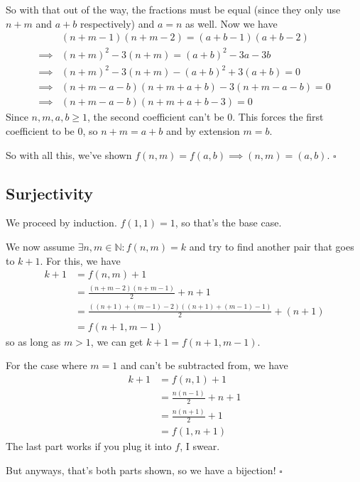 \documentclass[12pt]{article}
\newcommand{\N}{\mathbb{N}}
\begin{document}
So with that out of the way, the fractions must be equal
(since they only use $n+m$ and $a+b$ respectively) and $a=n$ as well.
Now we have
\begin{align*}
               & (n+m-1)(n+m-2)=(a+b-1)(a+b-2)   \\
  \implies{} & (n+m)^2-3(n+m)=(a+b)^2-3a-3b    \\
  \implies{} & (n+m)^2-3(n+m)-(a+b)^2+3(a+b)=0 \\
  \implies{} & (n+m-a-b)(n+m+a+b)-3(n+m-a-b)=0 \\
  \implies{} & (n+m-a-b)(n+m+a+b-3)=0
\end{align*}
Since $n, m, a, b \ge 1$, the second coefficient can't be $0$.
This forces the first coefficient to be $0$, so $n+m=a+b$ and by extension $m=b$.

So with all this, we've shown $f(n, m)=f(a, b) \implies (n, m)=(a, b)$. $\square$

\pagebreak

\subsection{Surjectivity}

We proceed by induction.
$f(1, 1)=1$, so that's the base case.

We now assume $\exists n, m \in \N: f(n, m)=k$
and try to find another pair that goes to $k+1$.
For this, we have
\begin{align*}
  k+1
   & = f(n, m)+1                                      \\
   & = \frac{(n+m-2)(n+m-1)}{2}+n+1                   \\
   & = \frac{((n+1)+(m-1)-2)((n+1)+(m-1)-1)}{2}+(n+1) \\
   & = f(n+1, m-1)
\end{align*}
so as long as $m > 1$, we can get $k+1=f(n+1, m-1)$.

For the case where $m=1$ and can't be subtracted from, we have
\begin{align*}
  k+1
   & = f(n, 1)+1            \\
   & = \frac{n(n-1)}{2}+n+1 \\
   & = \frac{n(n+1)}{2}+1   \\
   & = f(1, n+1)
\end{align*}
The last part works if you plug it into $f$, I swear.

But anyways, that's both parts shown, so we have a bijection! $\square$

\pagebreak
\end{document}
